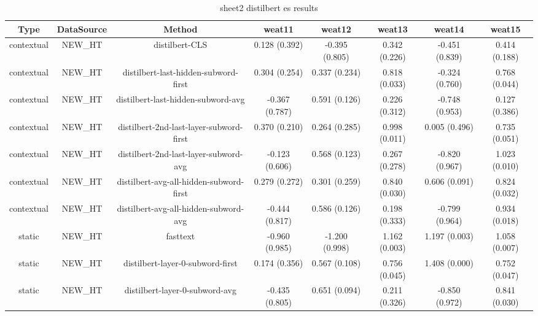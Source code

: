 \begin{sidewaystable}[htb]
    \centering
    \caption{sheet2 distilbert es results}
    \label{appendix_tab:sheet2_distilbert_es_results}
    \small
    \begin{tabular}{@{}cccccccc@{}}
        \toprule
        Type & DataSource & Method & weat11 & weat12 & weat13 & weat14 & weat15 \\
        \midrule
        contextual & NEW\_HT & distilbert-CLS & 0.128 (0.392) & -0.395 (0.805) & 0.342 (0.226) & -0.451 (0.839) & 0.414 (0.188) \\
        contextual & NEW\_HT & distilbert-last-hidden-subword-first & 0.304 (0.254) & 0.337 (0.234) & 0.818 (0.033) & -0.324 (0.760) & 0.768 (0.044) \\
        contextual & NEW\_HT & distilbert-last-hidden-subword-avg & -0.367 (0.787) & 0.591 (0.126) & 0.226 (0.312) & -0.748 (0.953) & 0.127 (0.386) \\
        contextual & NEW\_HT & distilbert-2nd-last-layer-subword-first & 0.370 (0.210) & 0.264 (0.285) & 0.998 (0.011) & 0.005 (0.496) & 0.735 (0.051) \\
        contextual & NEW\_HT & distilbert-2nd-last-layer-subword-avg & -0.123 (0.606) & 0.568 (0.123) & 0.267 (0.278) & -0.820 (0.967) & 1.023 (0.010) \\
        contextual & NEW\_HT & distilbert-avg-all-hidden-subword-first & 0.279 (0.272) & 0.301 (0.259) & 0.840 (0.030) & 0.606 (0.091) & 0.824 (0.032) \\
        contextual & NEW\_HT & distilbert-avg-all-hidden-subword-avg & -0.444 (0.817) & 0.586 (0.126) & 0.198 (0.333) & -0.799 (0.964) & 0.934 (0.018) \\
        static & NEW\_HT & fasttext & -0.960 (0.985) & -1.200 (0.998) & 1.162 (0.003) & 1.197 (0.003) & 1.058 (0.007) \\
        static & NEW\_HT & distilbert-layer-0-subword-first & 0.174 (0.356) & 0.567 (0.108) & 0.756 (0.045) & 1.408 (0.000) & 0.752 (0.047) \\
        static & NEW\_HT & distilbert-layer-0-subword-avg & -0.435 (0.805) & 0.651 (0.094) & 0.211 (0.326) & -0.850 (0.972) & 0.841 (0.030) \\
        \bottomrule
    \end{tabular}
\end{sidewaystable}